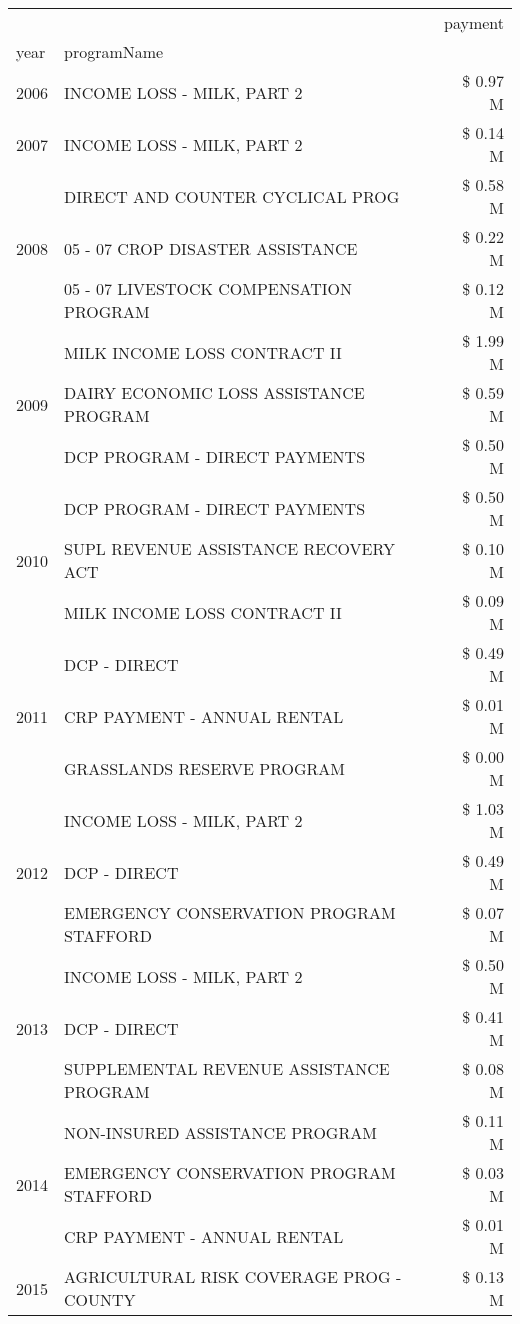 \begin{tabular}{llr}
\toprule
 &  & payment \\
year & programName &  \\
\midrule
2006 & INCOME LOSS - MILK, PART 2 & \$ 0.97 M \\
\cline{1-3}
2007 & INCOME LOSS - MILK, PART 2 & \$ 0.14 M \\
\cline{1-3}
\multirow[t]{3}{*}{2008} & DIRECT AND COUNTER CYCLICAL PROG & \$ 0.58 M \\
 & 05 - 07 CROP DISASTER ASSISTANCE & \$ 0.22 M \\
 & 05 - 07 LIVESTOCK COMPENSATION PROGRAM & \$ 0.12 M \\
\cline{1-3}
\multirow[t]{3}{*}{2009} & MILK INCOME LOSS CONTRACT II & \$ 1.99 M \\
 & DAIRY ECONOMIC LOSS ASSISTANCE PROGRAM & \$ 0.59 M \\
 & DCP PROGRAM - DIRECT PAYMENTS & \$ 0.50 M \\
\cline{1-3}
\multirow[t]{3}{*}{2010} & DCP PROGRAM - DIRECT PAYMENTS & \$ 0.50 M \\
 & SUPL REVENUE ASSISTANCE RECOVERY ACT & \$ 0.10 M \\
 & MILK INCOME LOSS CONTRACT II & \$ 0.09 M \\
\cline{1-3}
\multirow[t]{3}{*}{2011} & DCP - DIRECT & \$ 0.49 M \\
 & CRP PAYMENT - ANNUAL RENTAL & \$ 0.01 M \\
 & GRASSLANDS RESERVE PROGRAM & \$ 0.00 M \\
\cline{1-3}
\multirow[t]{3}{*}{2012} & INCOME LOSS - MILK, PART 2 & \$ 1.03 M \\
 & DCP - DIRECT & \$ 0.49 M \\
 & EMERGENCY CONSERVATION PROGRAM STAFFORD & \$ 0.07 M \\
\cline{1-3}
\multirow[t]{3}{*}{2013} & INCOME LOSS - MILK, PART 2 & \$ 0.50 M \\
 & DCP - DIRECT & \$ 0.41 M \\
 & SUPPLEMENTAL REVENUE ASSISTANCE PROGRAM & \$ 0.08 M \\
\cline{1-3}
\multirow[t]{3}{*}{2014} & NON-INSURED ASSISTANCE PROGRAM & \$ 0.11 M \\
 & EMERGENCY CONSERVATION PROGRAM STAFFORD & \$ 0.03 M \\
 & CRP PAYMENT - ANNUAL RENTAL & \$ 0.01 M \\
\cline{1-3}
\multirow[t]{3}{*}{2015} & AGRICULTURAL RISK COVERAGE PROG - COUNTY & \$ 0.13 M \\

\end{tabular}
